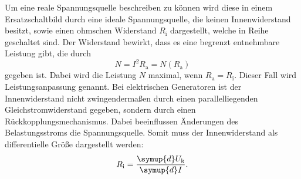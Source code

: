 Um eine reale Spannungsquelle beschreiben zu können wird diese in einem Ersatzschaltbild durch eine ideale Spannungsquelle, die keinen Innenwiderstand besitzt, sowie einen ohmschen Widerstand $R_{\text{i}}$ dargestellt, welche
in Reihe geschaltet sind. Der Widerstand bewirkt, dass es eine begrenzt entnehmbare Leistung gibt, die durch
   \begin{equation*}
   N = I^2 R_{\text{a}} = N(R_{\text{a}})
   \end{equation*}
gegeben ist. Dabei wird die Leistung $N$ maximal, wenn $R_{\text{a}} = R_{\text{i}}$. Dieser Fall wird Leistungsanpassung genannt.
Bei elektrischen Generatoren ist der Innenwiderstand nicht zwingendermaßen durch einen parallelliegenden Gleichstromwiderstand gegeben, sondern durch einen Rückkopplungsmechanismus.
Dabei beeinflussen Änderungen des Belastungsstroms die Spannungsquelle. Somit muss der Innenwiderstand als differentielle Größe dargestellt werden:
   \begin{equation*}
   R_{\text{i}} = \frac{\symup{d} U_{\text{k}}}{\symup{d}I}.
  \end{equation*}
